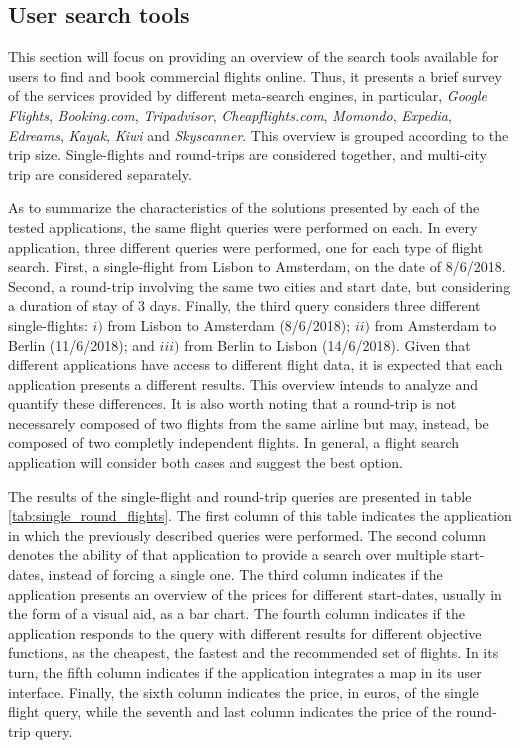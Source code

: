 \subsection{User search tools}
\label{sec:user_st}

This section will focus on providing an overview of the search tools available for users to find and book commercial flights online. Thus, it presents a brief survey of the services provided by different meta-search engines, in particular, \textit{Google Flights}, \textit{Booking.com}, \textit{Tripadvisor}, \textit{Cheapflights.com}, \textit{Momondo}, \textit{Expedia}, \textit{Edreams}, \textit{Kayak}, \textit{Kiwi} and \textit{Skyscanner}. This overview is grouped according to the trip size. Single-flights and round-trips are considered together, and multi-city trip are considered separately.

As to summarize the characteristics of the solutions presented by each of the tested applications, the same flight queries were performed on each. In every application, three different queries were performed, one for each type of flight search. First, a single-flight from Lisbon to Amsterdam, on the date of 8/6/2018. Second, a round-trip involving the same two cities and start date, but considering a duration of stay of 3 days. Finally, the third query considers three different single-flights: $i)$ from Lisbon to Amsterdam (8/6/2018); $ii)$ from Amsterdam to Berlin (11/6/2018); and $iii)$ from Berlin to Lisbon (14/6/2018). Given that different applications have access to different flight data, it is expected that each application presents a different results. This overview intends to analyze and quantify these differences. It is also worth noting that a round-trip is not necessarely composed of two flights from the same airline but may, instead, be composed of two completly independent flights. In general, a flight search application will consider both cases and suggest the best option.

The results of the single-flight and round-trip queries are presented in table \ref{tab:single_round_flights}. The first column of this table indicates the application in which the previously described queries were performed. The second column denotes the ability of that application to provide a search over multiple start-dates, instead of forcing a single one. The third column indicates if the application presents an overview of the prices for different start-dates, usually in the form of a visual aid, as a bar chart. The fourth column indicates if the application responds to the query with different results for different objective functions, as the cheapest, the fastest and the recommended set of flights. In its turn, the fifth column indicates if the application integrates a map in its user interface. Finally, the sixth column indicates the price, in euros, of the single flight query, while the seventh and last column indicates the price of the round-trip query.

